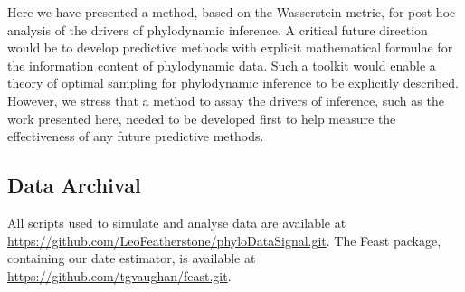 \documentclass{article}
\begin{document}
Here we have presented a method, based on the Wasserstein metric, for post-hoc analysis of the drivers of phylodynamic inference. A critical future direction would be to develop predictive methods with explicit mathematical formulae for the information content of phylodynamic data. Such a toolkit would enable a theory of optimal sampling for phylodynamic inference to be explicitly described. However, we stress that a method to assay the drivers of inference, such as the work presented here, needed to be developed first to help measure the effectiveness of any future predictive methods. 





    
\subsection*{Data Archival}
All scripts used to simulate and analyse data are available at \url{https://github.com/LeoFeatherstone/phyloDataSignal.git}. The Feast package, containing our date estimator, is available at \url{https://github.com/tgvaughan/feast.git}.
\end{document}

